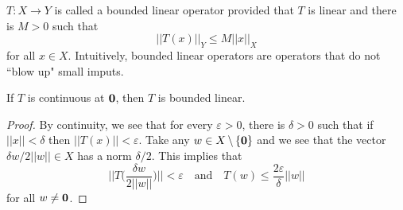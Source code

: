 \vspace{2ex}
\begin{defi}
$T:X\rightarrow Y$ is called a bounded linear operator provided that $T$ is linear and there is $M>0$ such that 
\[||T(x)||_{Y}\leq M||x||_{X}\]
for all $x\in X$. Intuitively, bounded linear operators are operators that do not ``blow up" small imputs.
\end{defi}
\vspace{2ex}
\begin{prop}
If $T$ is continuous at ${\bf 0}$, then $T$ is bounded linear.
\end{prop}
\vspace{2ex}
\begin{proof}
By continuity, we see that for every $\varepsilon >0$, there is $\delta >0$ such that if $||x||<\delta $ then $||T(x)||<\varepsilon $. Take any $w\in X\,\backslash\,\{{\bf 0}\}$ and we see that the vector $\delta w/2||w||\in X$ has a norm $\delta /2$. This implies that
\[||T\Big(\dfrac{\delta w}{2||w||}\Big)||<\varepsilon \quad \mathrm{and}\quad T(w)\leq \dfrac{2\varepsilon }{\delta }||w||\]
for all $w\ne {\bf 0}$. 
\end{proof}
\vspace{2ex}

